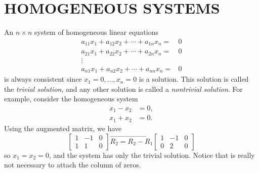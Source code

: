 \documentclass[../main.tex]{subfiles}
\begin{document}
\section[Homogeneous Systems]{HOMOGENEOUS SYSTEMS}
An $n \times n$ system of homogeneous linear equations
$$
\begin{aligned}
a_{11} x_{1}+a_{12} x_{2}+\cdots+a_{1 n} x_{n}=& 0 \\
a_{21} x_{1}+a_{22} x_{2}+\cdots+a_{2 n} x_{n}=& 0 \\
\vdots & \\
a_{n 1} x_{1}+a_{n 2} x_{2}+\cdots+a_{n n} x_{n}=& 0
\end{aligned}
$$
is always consistent since $x_{1}=0, \ldots, x_{n}=0$ is a solution. This solution is called the \emph{trivial solution}, and any other solution is called a \emph{nontrivial solution}. For example, consider the homogeneous system
$$
\begin{aligned}
x_{1}-x_{2}&=0,\\
x_{1} + x_{2} &= 0.
\end{aligned}
$$
Using the augmented matrix, we have
$$
\left[\begin{array}{cc|c}
1 & -1 & 0 \\
1 & 1 & 0
\end{array}\right] \overrightarrow{R_{2}=R_{2}-R_{1}}\left[\begin{array}{cc|c}
1 & -1 & 0 \\
0 & 2 & 0
\end{array}\right]
$$
so $x_{1}=x_{2}=0$, and the system has only the trivial solution. Notice that is really not necessary to attach the column of zeros.
\end{document}
